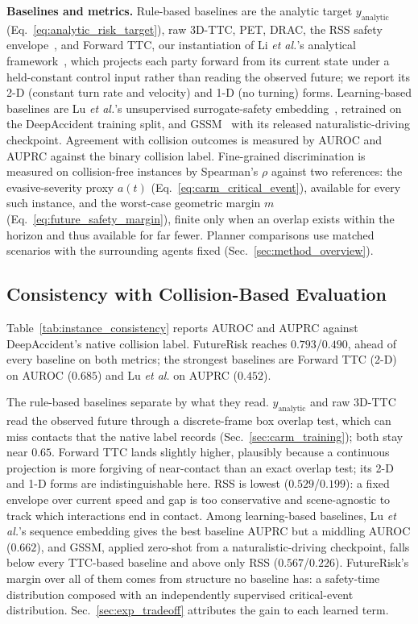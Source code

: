 \documentclass[letterpaper, 10 pt, conference]{ieeeconf}  %
\begin{document}
\noindent\textbf{Baselines and metrics.}
Rule-based baselines are the analytic target $y_{\mathrm{analytic}}$
(Eq.~\eqref{eq:analytic_risk_target}), raw 3D-TTC, PET, DRAC, the RSS
safety envelope~\cite{shalevshwartz2017rss}, and Forward TTC, our
instantiation of Li \emph{et al.}'s analytical framework~\cite{li2024beyond},
which projects each party forward from its current state under a
held-constant control input rather than reading the observed future; we
report its 2-D (constant turn rate and velocity) and 1-D (no turning)
forms. Learning-based baselines are Lu \emph{et al.}'s unsupervised
surrogate-safety embedding~\cite{lu2022learning}, retrained on the
DeepAccident training split, and GSSM~\cite{jiao2026gssm} with its
released naturalistic-driving checkpoint. Agreement with collision
outcomes is measured by AUROC and AUPRC against the binary collision
label. Fine-grained discrimination is measured on collision-free
instances by Spearman's $\rho$ against two references: the
evasive-severity proxy $a(t)$ (Eq.~\eqref{eq:carm_critical_event}),
available for every such instance, and the worst-case geometric margin
$m$ (Eq.~\eqref{eq:future_safety_margin}), finite only when an overlap
exists within the horizon and thus available for far fewer. Planner
comparisons use matched scenarios with the surrounding agents fixed
(Sec.~\ref{sec:method_overview}).

\subsection{Consistency with Collision-Based Evaluation}
\label{sec:exp_consistency}

Table~\ref{tab:instance_consistency} reports AUROC and AUPRC against
DeepAccident's native collision label. FutureRisk reaches $0.793$/$0.490$,
ahead of every baseline on both metrics; the strongest baselines are
Forward TTC (2-D) on AUROC ($0.685$) and Lu \emph{et al.} on AUPRC
($0.452$).

The rule-based baselines separate by what they read. $y_{\mathrm{analytic}}$
and raw 3D-TTC read the observed future through a discrete-frame box
overlap test, which can miss contacts that the native label records
(Sec.~\ref{sec:carm_training}); both stay near $0.65$. Forward TTC lands
slightly higher, plausibly because a continuous projection is more
forgiving of near-contact than an exact overlap test; its 2-D and 1-D
forms are indistinguishable here. RSS is lowest ($0.529$/$0.199$): a fixed
envelope over current speed and gap is too conservative and
scene-agnostic to track which interactions end in contact. Among
learning-based baselines, Lu \emph{et al.}'s sequence embedding gives the
best baseline AUPRC but a middling AUROC ($0.662$), and GSSM, applied
zero-shot from a naturalistic-driving checkpoint, falls below every
TTC-based baseline and above only RSS ($0.567$/$0.226$). FutureRisk's
margin over all of them comes from structure no baseline has: a
safety-time distribution composed with an independently supervised
critical-event distribution. Sec.~\ref{sec:exp_tradeoff} attributes the
gain to each learned term.
\end{document}

